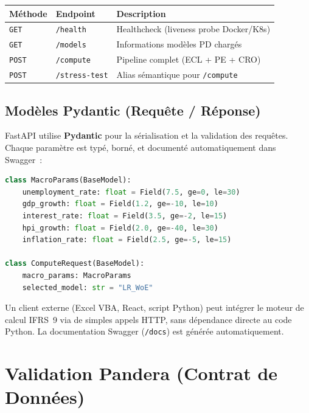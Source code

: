 \documentclass[12pt,a4paper]{article}
\begin{document}
\begin{center}
\begin{tabular}{llp{6cm}}
\toprule
\textbf{M\'ethode} & \textbf{Endpoint} & \textbf{Description} \\
\midrule
\texttt{GET} & \texttt{/health} & Healthcheck (liveness probe Docker/K8s) \\
\texttt{GET} & \texttt{/models} & Informations mod\`eles PD charg\'es \\
\texttt{POST} & \texttt{/compute} & Pipeline complet (ECL + PE + CRO) \\
\texttt{POST} & \texttt{/stress-test} & Alias s\'emantique pour \texttt{/compute} \\
\bottomrule
\end{tabular}
\end{center}

\subsection{Mod\`eles Pydantic (Requ\^ete / R\'eponse)}

FastAPI utilise \textbf{Pydantic} pour la s\'erialisation et la validation des requ\^etes. Chaque param\`etre est typ\'e, born\'e, et document\'e automatiquement dans Swagger~:

\begin{formulebox}
\begin{lstlisting}[language=Python]
class MacroParams(BaseModel):
    unemployment_rate: float = Field(7.5, ge=0, le=30)
    gdp_growth: float = Field(1.2, ge=-10, le=10)
    interest_rate: float = Field(3.5, ge=-2, le=15)
    hpi_growth: float = Field(2.0, ge=-40, le=30)
    inflation_rate: float = Field(2.5, ge=-5, le=15)

class ComputeRequest(BaseModel):
    macro_params: MacroParams
    selected_model: str = "LR_WoE"
\end{lstlisting}
\end{formulebox}

\begin{interpretbox}
Un client externe (Excel VBA, React, script Python) peut int\'egrer le moteur de calcul IFRS~9 via de simples appels HTTP, sans d\'ependance directe au code Python. La documentation Swagger (\texttt{/docs}) est g\'en\'er\'ee automatiquement.
\end{interpretbox}


\section{Validation Pandera (Contrat de Donn\'ees)}
\label{sec:pandera}
\end{document}
